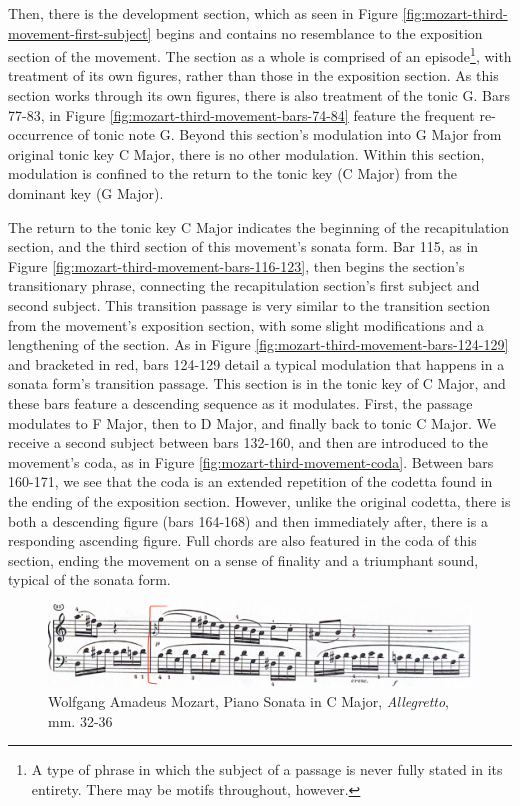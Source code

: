 Then, there is the development section, which as seen in Figure \ref{fig:mozart-third-movement-first-subject}\autocite{Henle_1977} begins and contains no resemblance to the exposition section of the movement. The section as a whole is comprised of an episode\footnote{A type of phrase in which the subject of a passage is never fully stated in its entirety. There may be motifs throughout, however.}, with treatment of its own figures, rather than those in the exposition section. As this section works through its own figures, there is also treatment of the tonic G. Bars 77-83, in Figure \ref{fig:mozart-third-movement-bars-74-84}\autocite{Henle_1977} feature the frequent re-occurrence of tonic note G. Beyond this section's modulation into G Major from original tonic key C Major, there is no other modulation. Within this section, modulation is confined to the return to the tonic key (C Major) from the dominant key (G Major).

The return to the tonic key C Major indicates the beginning of the recapitulation section, and the third section of this movement's sonata form. Bar 115, as in Figure \ref{fig:mozart-third-movement-bars-116-123}\autocite{Henle_1977}, then begins the section's transitionary phrase, connecting the recapitulation section's first subject and second subject. This transition passage is very similar to the transition section from the movement's exposition section, with some slight modifications and a lengthening of the section. As in Figure \ref{fig:mozart-third-movement-bars-124-129}\autocite{Henle_1977} and bracketed in red, bars 124-129 detail a typical modulation that happens in a sonata form's transition passage. This section is in the tonic key of C Major, and these bars feature a descending sequence as it modulates. First, the passage modulates to F Major, then to D Major, and finally back to tonic C Major. We receive a second subject between bars 132-160, and then are introduced to the movement's coda, as in Figure \ref{fig:mozart-third-movement-coda}\autocite{Henle_1977}. Between bars 160-171, we see that the coda is an extended repetition of the codetta found in the ending of the exposition section. However, unlike the original codetta, there is both a descending figure (bars 164-168) and then immediately after, there is a responding ascending figure. Full chords are also featured in the coda of this section, ending the movement on a sense of finality and a triumphant sound, typical of the sonata form.

\begin{figure}
	\centering
	\includegraphics[width=\textwidth]{figures/mozart-third-movement-beginning-of-second-subject-exposition.jpg}
	\caption{Wolfgang Amadeus Mozart, Piano Sonata in C Major, \textit{Allegretto}, mm. 32-36}
	\label{fig:mozart-third-movement-beginning-of-second-subject-exposition}
\end{figure}

